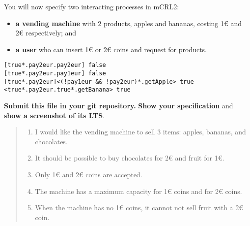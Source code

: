 \documentclass[11pt]{article}
\begin{document}
\begin{myExercise} \label{ex:vm}
You will now specify two interacting processes in mCRL2:
\begin{itemize}
  \item \textbf{a vending machine} with 2 products, apples and bananas, costing 1€ and 2€ respectively; and
  \item \textbf{a user} who can insert 1€ or 2€ coins and request for products.
\end{itemize}

\begin{lstlisting}
[true*.pay2eur.pay2eur] false
[true*.pay2eur.pay1eur] false
[true*.pay2eur]<(!pay1eur && !pay2eur)*.getApple> true
<true*.pay2eur.true*.getBanana> true \end{lstlisting}
\textbf{Submit this file in your git repository.}
\textbf{Show your specification} and \textbf{show a screenshot of its LTS}.

\vspace{2mm}
\begin{quote}\it
  \begin{enumerate}
    \item I would like the vending machine to sell 3 items: apples, bananas, and chocolates.
    \item It should be possible to buy chocolates for 2€ and fruit for 1€.
    \item Only 1€ and 2€ coins are accepted.
    \item The machine has a maximum capacity for 1€ coins and for 2€ coins. 
    \item When the machine has no 1€ coins, it cannot not sell fruit with a 2€ coin. 
 \end{enumerate}
\end{quote}
\end{myExercise}
\end{document}
